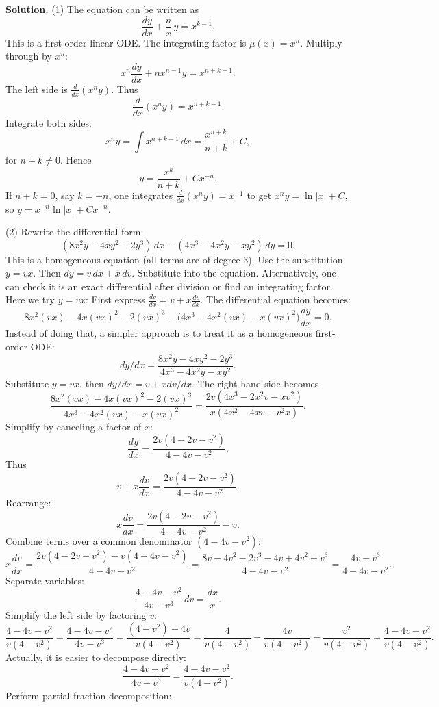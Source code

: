 \documentclass[12pt, a4paper, oneside]{article}
\newenvironment{solution}
  {\par\noindent\textbf{Solution. }\newline}
  {\par}
\begin{document}
\begin{solution}
(1) The equation can be written as 
\[
\frac{dy}{dx} + \frac{n}{x}\,y = x^{k-1}.
\]
This is a first-order linear ODE. The integrating factor is \(\mu(x) = x^n\). Multiply through by \(x^n\):
\[
x^n \frac{dy}{dx} + nx^{n-1}y = x^{n+k-1}.
\]
The left side is \(\frac{d}{dx}(x^n y)\). Thus
\[
\frac{d}{dx}(x^n y) = x^{n+k-1}.
\]
Integrate both sides:
\[
x^n y = \int x^{n+k-1}\,dx = \frac{x^{n+k}}{n+k} + C,
\]
for \(n+k\neq 0\). Hence
\[
y = \frac{x^k}{n+k} + Cx^{-n}.
\]
If \(n+k=0\), say \(k=-n\), one integrates \(\frac{d}{dx}(x^n y)= x^{-1}\) to get \(x^n y = \ln|x| + C\), so \(y = x^{-n}\ln|x| + Cx^{-n}\). 

(2) Rewrite the differential form:
\[
(8x^2y - 4xy^2 - 2y^3)\,dx - (4x^3 - 4x^2y - x y^2)\,dy = 0.
\]
This is a homogeneous equation (all terms are of degree 3). Use the substitution \(y = vx\). Then \(dy = v\,dx + x\,dv\). Substitute into the equation. Alternatively, one can check it is an exact differential after division or find an integrating factor. Here we try \(y = vx\):
First express \(\frac{dy}{dx} = v + x\frac{dv}{dx}\). The differential equation becomes:
\[
8x^2(vx) - 4x(vx)^2 - 2(vx)^3 - \bigl(4x^3 - 4x^2(vx) - x(vx)^2\bigr)\frac{dy}{dx} = 0.
\]
Instead of doing that, a simpler approach is to treat it as a homogeneous first-order ODE:
\[
dy/dx = \frac{8x^2y - 4xy^2 - 2y^3}{4x^3 - 4x^2y - xy^2}.
\]
Substitute \(y=vx\), then \(dy/dx = v + x dv/dx\). The right-hand side becomes
\[
\frac{8x^2(vx) - 4x(vx)^2 - 2(vx)^3}{4x^3 - 4x^2(vx) - x(vx)^2}
= \frac{2v(4x^3 - 2x^2v - xv^2)}{x(4x^2 - 4xv - v^2x)}.
\]
Simplify by canceling a factor of \(x\):
\[
\frac{dy}{dx} = \frac{2v(4 - 2v - v^2)}{4 - 4v - v^2}.
\]
Thus
\[
v + x\frac{dv}{dx} = \frac{2v(4 - 2v - v^2)}{4 - 4v - v^2}.
\]
Rearrange:
\[
x\frac{dv}{dx} = \frac{2v(4 - 2v - v^2)}{4 - 4v - v^2} - v.
\]
Combine terms over a common denominator \((4 - 4v - v^2)\):
\[
x\frac{dv}{dx} = \frac{2v(4 - 2v - v^2) - v(4 - 4v - v^2)}{4 - 4v - v^2} 
= \frac{8v -4v^2 -2v^3 - 4v +4v^2 + v^3}{4 - 4v - v^2}
= \frac{4v - v^3}{4 - 4v - v^2}.
\]
Separate variables:
\[
\frac{4 - 4v - v^2}{4v - v^3}\,dv = \frac{dx}{x}.
\]
Simplify the left side by factoring \(v\):
\[
\frac{4 - 4v - v^2}{v(4 - v^2)} = \frac{4 - 4v - v^2}{4v - v^3} 
= \frac{(4 - v^2) - 4v}{v(4 - v^2)} 
= \frac{4}{v(4-v^2)} - \frac{4v}{v(4-v^2)} - \frac{v^2}{v(4-v^2)}
= \frac{4 - 4v - v^2}{v(4 - v^2)}.
\]
Actually, it is easier to decompose directly:
\[
\frac{4 - 4v - v^2}{4v - v^3} = \frac{4 - 4v - v^2}{v(4 - v^2)}.
\]
Perform partial fraction decomposition:
\[
\]
\end{solution}
\end{document}
